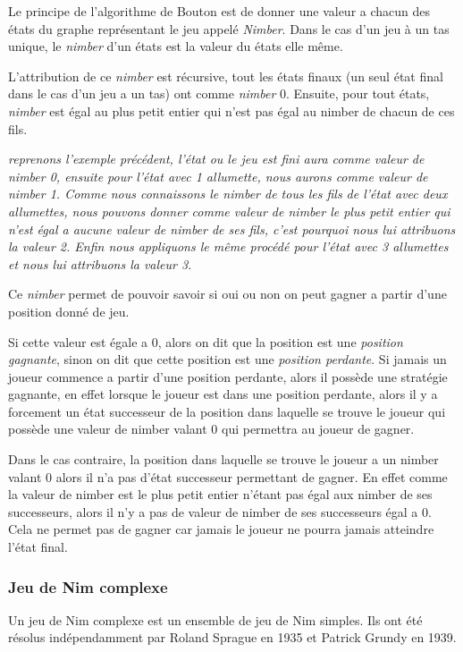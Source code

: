     Le principe de l'algorithme de Bouton est de donner une valeur a chacun des états du graphe représentant le jeu appelé \textit{Nimber}. Dans le cas d'un jeu \`a un tas unique, le \textit{nimber} d'un états est la valeur du états elle même.

    L'attribution de ce \textit{nimber} est récursive, tout les états finaux (un seul état final dans le cas d'un jeu a un tas) ont comme \textit{nimber} 0. Ensuite, pour tout états, \textit{nimber} est égal au plus petit entier qui n'est pas égal au nimber de chacun de ces fils.

    \textit {
    reprenons l'exemple précédent, l’état ou le jeu est fini aura comme valeur de nimber 0, ensuite pour l’état avec 1 allumette, nous aurons comme valeur de nimber 1. Comme nous connaissons le nimber de tous les fils de l’état avec deux allumettes, nous pouvons donner comme valeur de nimber le plus petit entier qui n'est égal a aucune valeur de nimber de ses fils, c'est pourquoi nous lui attribuons la valeur 2. Enfin nous appliquons le même procédé pour l’état avec 3 allumettes et nous lui attribuons la valeur 3.
    }

    Ce \textit{nimber} permet de pouvoir savoir si oui ou non on peut gagner a partir d'une position donné de jeu.

    Si cette valeur est égale a 0, alors on dit que la position est une \textit{position gagnante}, sinon on dit que cette position est une \textit{position perdante}. Si jamais un joueur commence a partir d'une position perdante, alors il possède une stratégie gagnante, en effet lorsque le joueur est dans une position perdante, alors il y a forcement un état successeur de la position dans laquelle se trouve le joueur qui possède une valeur de nimber valant 0 qui permettra au joueur de gagner.

    Dans le cas contraire, la position dans laquelle se trouve le joueur a un nimber valant 0 alors il n'a pas d’état successeur permettant de gagner. En effet comme la valeur de nimber est le plus petit entier n’étant pas égal aux nimber de ses successeurs, alors il n'y a pas de valeur de nimber de ses successeurs égal a 0. Cela ne permet pas de gagner car jamais le joueur ne pourra jamais atteindre l’état final.

  \subsubsection{Jeu de Nim complexe}
  \label{subsub:Jeu de Nim complexe}
    Un jeu de Nim complexe est un ensemble de jeu de Nim simples. Ils ont été résolus indépendamment par Roland Sprague en 1935 et Patrick Grundy en 1939.

